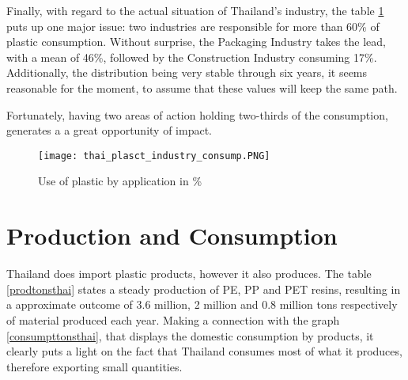 \documentclass[twoside,a4paper,12pt]{report}
\begin{document}


Finally, with regard to the actual situation of Thailand's industry, the table \ref{pp_thai_percent} puts up one major issue: two industries are responsible for more than 60\% of plastic consumption. Without surprise, the Packaging Industry takes the lead, with a mean of 46\%, followed by the Construction Industry consuming 17\%. Additionally, the distribution being very stable through six years, it seems reasonable for the moment, to assume that these values will keep the same path.

Fortunately, having two areas of action holding two-thirds of the consumption, generates a a great opportunity of impact.


\begin{figure}
    \centering
    \texttt{[image: thai\_plasct\_industry\_consump.PNG]}
    \caption{Use of plastic by application in \% \cite{CLusterplastprod}}
     \label{pp_thai_percent}
\end{figure}


\section{Production and Consumption}
Thailand does import plastic products, however it also produces.
The table \ref{prodtonsthai} states a steady production of PE, PP and PET resins, resulting in a approximate outcome of 3.6 million, 2 million and 0.8 million tons respectively of material produced each year. 
Making a connection with the graph \ref{consumpttonsthai}, that displays the domestic consumption by products, it clearly puts a light on the fact that Thailand consumes most of what it produces, therefore exporting small quantities.
\end{document}
